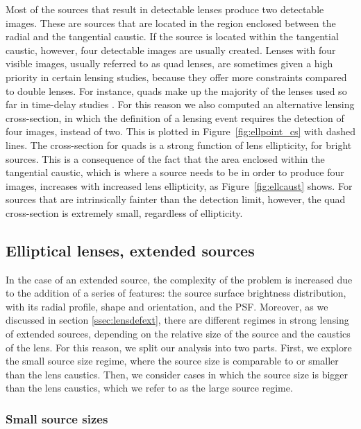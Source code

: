 \documentclass{aa}
\def\Fref#1{Figure~\ref{#1}\xspace}
\begin{document}
Most of the sources that result in detectable lenses produce two detectable images. These are sources that are located in the region enclosed between the radial and the tangential caustic. 
If the source is located within the tangential caustic, however, four detectable images are usually created.
Lenses with four visible images, usually referred to as quad lenses, are sometimes given a high priority in certain lensing studies, because they offer more constraints compared to double lenses. For instance, quads make up the majority of the lenses used so far in time-delay studies \citep{Mil++20}.
For this reason we also computed an alternative lensing cross-section, in which the definition of a lensing event requires the detection of four images, instead of two.
This is plotted in \Fref{fig:ellpoint_cs} with dashed lines.
The cross-section for quads is a strong function of lens ellipticity, for bright sources.
This is a consequence of the fact that the area enclosed within the tangential caustic, which is where a source needs to be in order to produce four images, increases with increased lens ellipticity, as \Fref{fig:ellcaust} shows.
For sources that are intrinsically fainter than the detection limit, however, the quad cross-section is extremely small, regardless of ellipticity.


\subsection{Elliptical lenses, extended sources}\label{ssec:ellext}

In the case of an extended source, the complexity of the problem is increased due to the addition of a series of features: the source surface brightness distribution, with its radial profile, shape and orientation, and the PSF. 
Moreover, as we discussed in section \ref{ssec:lensdefext}, there are different regimes in strong lensing of extended sources, depending on the relative size of the source and the caustics of the lens.
For this reason, we split our analysis into two parts. First, we explore the small source size regime, where the source size is comparable to or smaller than the lens caustics. Then, we consider cases in which the source size is bigger than the lens caustics, which we refer to as the large source regime.

\subsubsection{Small source sizes}
\end{document}
